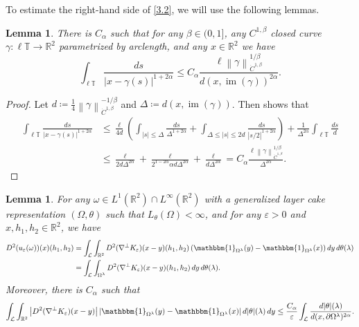 \documentclass[reqno,centertags,12pt]{amsart}
\newtheorem{lemma}[theorem]{Lemma}
\theoremstyle{definition}
\numberwithin{equation}{section}
\newcommand{\abs}[1]{\left\lvert#1\right\rvert}
\newcommand{\norm}[1]{\left\|#1\right\|}
\newcommand{\bbR}{{\mathbb{R}}}
\newcommand{\bbT}{{\mathbb{T}}}
\newcommand{\eps}{\varepsilon}
\newcommand{\tht}{\theta}
\begin{document}
To estimate the right-hand side of \eqref{3.2}, we will use the following lemmas.

\begin{lemma}\label{L3.5}
    There is $C_{\alpha}$ such that for any $\beta\in(0,1]$, any $C^{1,\beta}$ closed curve
    $\gamma\colon\ell\bbT\to\bbR^{2}$ parametrized by arclength, and any $x\in\bbR^{2}$ we have
    \[
        \int_{\ell\bbT}\frac{ds}{\abs{x - \gamma(s)}^{1+2\alpha}}
        \leq C_{\alpha}\frac{\ell\norm{\gamma}_{\dot{C}^{1,\beta}}^{1/\beta}}
        {d(x,\operatorname{im}(\gamma))^{2\alpha}}.
    \]
\end{lemma}

\begin{proof}
    Let $d\coloneqq\frac{1}{4}\norm{\gamma}_{\dot{C}^{1,\beta}}^{-1/\beta}$
    and $\Delta\coloneqq d(x,\operatorname{im}(\gamma))$.
    Then \cite[Lemma~A.2]{JeoZlaTouching} shows that
    \begin{align*}
        \int_{\ell\bbT}\frac{ds}{\abs{x - \gamma(s)}^{1+2\alpha}}
        &\leq \frac{\ell}{4d}\left(
            \int_{\abs{s}\leq\Delta}\frac{ds}{\Delta^{1+2\alpha}}
            + \int_{\Delta\leq\abs{s}\leq 2d}\frac{ds}{\abs{s/2}^{1+2\alpha}}
        \right)
        + \frac{1}{\Delta^{2\alpha}}\int_{\ell\bbT}\frac{ds}{d} \\
        &\leq \frac{\ell}{2d\Delta^{2\alpha}}
        + \frac{\ell}{2^{1-2\alpha}\alpha d\Delta^{2\alpha}}
        + \frac{\ell}{d\Delta^{2\alpha}}
        = C_{\alpha}\frac{\ell\norm{\gamma}_{\dot{C}^{1,\beta}}^{1/\beta}}
        {\Delta^{2\alpha}}.
    \end{align*}
\end{proof}

\begin{lemma}\label{L3.6}
    For any $\omega\in L^{1}(\bbR^{2})\cap L^{\infty}(\bbR^{2})$ with
    a generalized layer cake representation $(\Omega,\theta)$
    such that $L_{\tht}(\Omega)<\infty$, and for any $\eps>0$ and $x,h_{1},h_{2}\in\bbR^{2}$, we have
    \begin{align*}
        D^{2}(u_{\eps}(\omega))(x)(h_{1},h_{2})
        &= \int_{\mathcal{L}}\int_{\bbR^{2}}
        D^{2}(\nabla^{\perp}K_{\eps})(x - y)(h_{1},h_{2})
        \left(\mathbbm{1}_{\Omega^{\lambda}}(y) - \mathbbm{1}_{\Omega^{\lambda}}(x)\right)
        dy\,d\theta(\lambda) \\
        &= \int_{\mathcal{L}}\int_{\Omega^{\lambda}}
        D^{2}(\nabla^{\perp}K_{\eps})(x - y)(h_{1},h_{2})
        \,dy\,d\theta(\lambda).
    \end{align*}
    Moreover, there is $C_{\alpha}$  such that
    \[
        \int_{\mathcal{L}}\int_{\bbR^{2}}
        \abs{D^{2}(\nabla^{\perp}K_{\eps})(x - y)}
        \abs{\mathbbm{1}_{\Omega^{\lambda}}(y) - \mathbbm{1}_{\Omega^{\lambda}}(x)}
        d|\theta|(\lambda)\,dy
        \leq \frac{C_{\alpha}}{\eps}
        \int_{\mathcal{L}}\frac{d|\theta|(\lambda)}{d(x,\partial\Omega^{\lambda})^{2\alpha}}.
    \]
\end{lemma}
\end{document}

